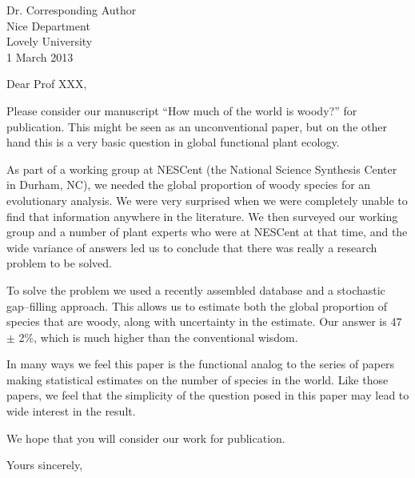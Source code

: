 \documentclass[a4paper,12pt]{article}
\begin{document}
{\raggedleft
  Dr. Corresponding Author\\
  Nice Department\\
  Lovely University\\
  1 March 2013\\
}

\vspace{3ex}

Dear Prof XXX,

Please consider our manuscript ``How much of the world is woody?''
for publication.  This might be seen as an unconventional paper, but
on the other hand this is a very basic question in global functional
plant ecology.

As part of a working group at NESCent (the National Science Synthesis
Center in Durham, NC), we needed the global proportion of woody
species for an evolutionary analysis.  We were very surprised when we
were completely unable to find that information anywhere in the
literature.  We then surveyed our working group and a number of plant
experts who were at NESCent at that time, and the wide variance of
answers led us to conclude that there was really a research problem to
be solved.

To solve the problem we used a recently assembled database and a
stochastic gap--filling approach.  This allows us to estimate both the
global proportion of species that are woody, along with uncertainty in
the estimate.  Our answer is 47 $\pm$ 2\%, which is much higher than
the conventional wisdom.

In many ways we feel this paper is the functional analog to the series
of papers making statistical estimates on the number of species in the
world.  Like those papers, we feel that the simplicity of the question
posed in this paper may lead to wide interest in the result.

We hope that you will consider our work for publication.

\vspace{2ex}
\hspace{.2\textwidth}Yours sincerely,\\[2ex]
\hspace*{.2\textwidth}
\end{document}
